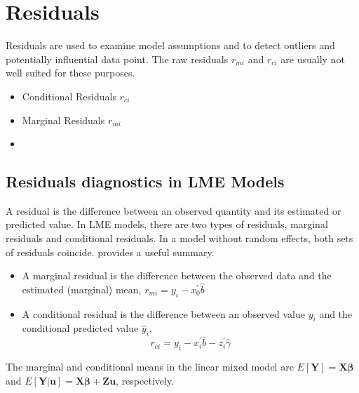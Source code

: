 \documentclass[Main.tex]{subfiles}
\begin{document}
	\section*{Residuals}
	
	Residuals are used to examine model assumptions and to detect outliers and potentially influential data
	point. The raw residuals $r_{mi}$ and $r_{ci}$ are usually not well suited for these purposes.
	
	\begin{itemize}
		\item Conditional Residuals $r_{ci}$
		\item Marginal Residuals $r_{mi}$
		\item 
	\end{itemize}
	
	
	
	\subsection{Residuals diagnostics in LME Models}
	
	
	A residual is the difference between an observed quantity and its
	estimated or predicted value. In LME models, there are two types
	of residuals, marginal residuals and conditional residuals. 
	In a model without random effects, both sets of residuals coincide.
	\citet{schabenberger} provides a useful summary. 
	
	\begin{itemize}
		\item A marginal residual is the difference between the observed data and the estimated (marginal) mean, $r_{mi} = y_i - x_0^{\prime} \hat{b}$
		\item A conditional residual is the difference between an observed value $y_{i}$ and the conditional predicted value $\hat{y}_{i} $,
		\[r_{ci} = y_i - x_i^{\prime} \hat{b} - z_i^{\prime} \hat{\gamma}\]
	\end{itemize} 
	
	The marginal and conditional means in the linear mixed model are
	$E[\boldsymbol{Y}] = \boldsymbol{X}\boldsymbol{\beta}$ and
	$E[\boldsymbol{Y|\boldsymbol{u}}] = \boldsymbol{X}\boldsymbol{\beta} + \boldsymbol{Z}\boldsymbol{u}$, respectively.
	
\end{document}
